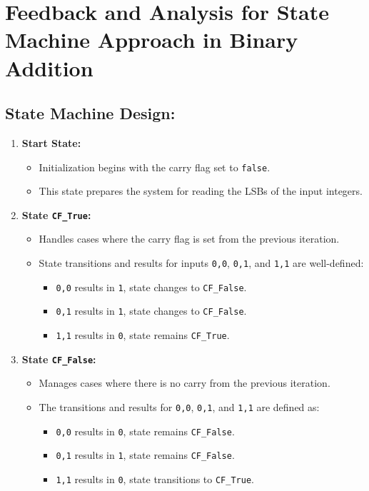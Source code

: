 \documentclass{article}
\begin{document}
\section*{Feedback and Analysis for State Machine Approach in Binary Addition}

\subsection*{State Machine Design:}

\begin{enumerate}
    \item \textbf{Start State:}
    \begin{itemize}
        \item Initialization begins with the carry flag set to \texttt{false}.
        \item This state prepares the system for reading the LSBs of the input integers.
    \end{itemize}
    
    \item \textbf{State \texttt{CF\_True}:}
    \begin{itemize}
        \item Handles cases where the carry flag is set from the previous iteration.
        \item State transitions and results for inputs \texttt{0,0}, \texttt{0,1}, and \texttt{1,1} are well-defined:
        \begin{itemize}
            \item \texttt{0,0} results in \texttt{1}, state changes to \texttt{CF\_False}.
            \item \texttt{0,1} results in \texttt{1}, state changes to \texttt{CF\_False}.
            \item \texttt{1,1} results in \texttt{0}, state remains \texttt{CF\_True}.
        \end{itemize}
    \end{itemize}

    \item \textbf{State \texttt{CF\_False}:}
    \begin{itemize}
        \item Manages cases where there is no carry from the previous iteration.
        \item The transitions and results for \texttt{0,0}, \texttt{0,1}, and \texttt{1,1} are defined as:
        \begin{itemize}
            \item \texttt{0,0} results in \texttt{0}, state remains \texttt{CF\_False}.
            \item \texttt{0,1} results in \texttt{1}, state remains \texttt{CF\_False}.
            \item \texttt{1,1} results in \texttt{0}, state transitions to \texttt{CF\_True}.
        \end{itemize}
    \end{itemize}


\end{enumerate}
\end{document}
